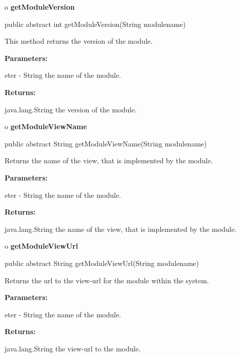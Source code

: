 o {\bf getModuleVersion} 

\begin{PRE}
 public abstract int getModuleVersion(String modulename)
\end{PRE}

\begin{description}
\htmlDD This method returns the version of the module. 

\begin{description}
\item {\bf Parameters:}  

eter - String the name of the module.  
\item {\bf Returns:}  

java.lang.String the version of the module.  
\end{description}

\end{description}

o {\bf getModuleViewName} 

\begin{PRE}
 public abstract String getModuleViewName(String modulename)
\end{PRE}

\begin{description}
\htmlDD Returns the name of the view, that is implemented by the module. 

\begin{description}
\item {\bf Parameters:}  

eter - String the name of the module.  
\item {\bf Returns:}  

java.lang.String the name of the view, that is implemented by the module.  
\end{description}

\end{description}

o {\bf getModuleViewUrl} 

\begin{PRE}
 public abstract String getModuleViewUrl(String modulename)
\end{PRE}

\begin{description}
\htmlDD Returns the url to the view-url for the module within the system. 

\begin{description}
\item {\bf Parameters:}  

eter - String the name of the module.  
\item {\bf Returns:}  

java.lang.String the view-url to the module.  
\end{description}

\end{description}

